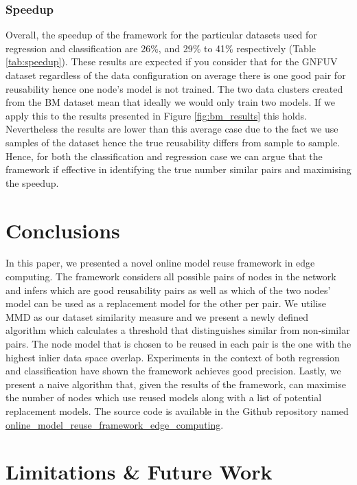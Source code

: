 \documentclass{mpaper}
\begin{document}
\subsubsection{Speedup}

Overall, the speedup of the framework for the particular datasets used for regression and classification are 26\%, and 29\% to 41\% respectively (Table \ref{tab:speedup}). These results are expected if you consider that for the GNFUV dataset regardless of the data configuration on average there is one good pair for reusability hence one node's model is not trained. The two data clusters created from the BM dataset mean that ideally we would only train two models. If we apply this to the results presented in Figure \ref{fig:bm_results} this holds. Nevertheless the results are lower than this average case due to the fact we use samples of the dataset hence the true reusability differs from sample to sample. Hence, for both the classification and regression case we can argue that the framework if effective in identifying the true number similar pairs and maximising the speedup. 

\section{Conclusions}

In this paper, we presented a novel online model reuse framework in edge computing. The framework considers all possible pairs of nodes in the network and infers which are good reusability pairs as well as which of the two nodes' model can be used as a replacement model for the other per pair. We utilise MMD as our dataset similarity measure and we present a newly defined algorithm which calculates a threshold that distinguishes similar from non-similar pairs. The node model that is chosen to be reused in each pair is the one with the highest inlier data space overlap. Experiments in the context of both regression and classification have shown the framework achieves good precision. Lastly, we present a naive algorithm that, given the results of the framework, can maximise the number of nodes which use reused models along with a list of potential replacement models. The source code is available in the Github repository named  \href{https:/github.com/XeniaSkotti/online_model_reuse_framework_edge_computing}{online\_model\_reuse\_framework\_edge\_computing}.

\section{Limitations \& Future Work}
\end{document}
